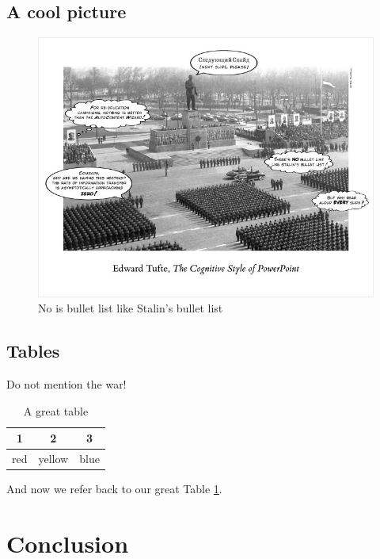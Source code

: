 \documentclass[]{article}
\begin{document}
\subsection{A cool picture}


\begin{figure}[h!]
	\includegraphics[width=1.0\textwidth]{../Figs/home_stalin_poster}
	\caption{No is bullet list like Stalin's bullet list}
\end{figure}

\subsection{Tables}

Do not mention the war! \citep{Cruijssen2010}
\begin{table}
	\caption{A great table}
	\label{tab: greattable}
	\centering
\begin{tabular}{ccc}
	\hline  
	1 & 2  & 3 \\ 
	\hline  
	red & yellow  & blue \\ 
	\hline 
\end{tabular} 
\end{table}

And now we refer back to our great Table \ref{tab: greattable}.


\section{Conclusion}

%


\end{document}
